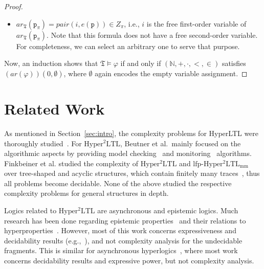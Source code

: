\documentclass[dvipsnames,10pt,a4paper]{amsart}
\theoremstyle{definition}
\theoremstyle{remark}
\newcommand{\nats}{\mathbb{N}}
\renewcommand{\phi}{\varphi}
\newcommand{\sohyltl}{\mathrm{Hyper^2LTL}\xspace}
\newcommand{\lfpsohyltlfp}{\mathrm{lfp\text{-}{Hyper^2LTL_{\mathrm{mm}}}}\xspace}
\newcommand{\tsys}{\mathfrak{T}}
\newcommand{\proposition}{\texttt{p}}
\newcommand{\arithmetize}{{\mathit{ar}}}
\newcommand{\pair}{\mathit{pair}}
\newcommand{\natsstruct}{(\nats, +, \cdot, <, \in)}
\begin{document}
\begin{proof}
\begin{itemize}
    \item $\arithmetize_\tsys(\proposition_\pi) = \pair(i,e(\proposition)) \in Z_\pi$, i.e., $i$ is the free first-order variable of $\arithmetize_\tsys(\proposition_\pi)$. Note that this formula does not have a free second-order variable. For completeness, we can select an arbitrary one to serve that purpose.
    
\end{itemize}
Now, an induction shows that $\tsys\models \phi$ if and only if $\natsstruct$ satisfies $(\arithmetize(\phi))(0,\emptyset)$, where $\emptyset$ again encodes the empty variable assignment.
\end{proof}





\section{Related Work}
\label{sec_relatedwork}
As mentioned in Section~\ref{sec:intro}, the complexity problems for HyperLTL were thoroughly studied~\cite{FinkbeinerH16,hyperltlsatconf,hyperltlsat}. For $\sohyltl$, Beutner et al.\ mainly focused on the algorithmic aspects by providing model checking~\cite{DBLP:conf/cav/BeutnerFFM23} and monitoring~\cite{BeutnerFFM24} algorithms.
Finkbeiner et al. studied the complexity of $\sohyltl$ and $\lfpsohyltlfp$ over tree-shaped and acyclic structures, which contain finitely many traces~\cite{FoSSaCS26}, thus all problems become decidable.
None of the above studied the respective complexity problems for general structures in depth. 

Logics related to $\sohyltl$ are asynchronous and epistemic logics. Much research has been done regarding epistemic properties~\cite{DBLP:conf/clima/Dima08,DBLP:books/mit/FHMV1995,DBLP:conf/atal/LomuscioR06a,DBLP:conf/fsttcs/MeydenS99} and their relations to hyperproperties~\cite{DBLP:conf/fossacs/BozzelliMP15}. However, most of this work concerns expressiveness and decidability results (e.g.,~\cite{DBLP:journals/tocl/BozzelliMM24}), and not complexity analysis for the undecidable fragments. This is similar for asynchronous hyperlogics~\cite{BartocciHNC23,DBLP:conf/cav/BaumeisterCBFS21,BeutnerF23,DBLP:journals/corr/abs-2404-16778,DBLP:conf/lics/BozzelliPS21,DBLP:conf/concur/BozzelliPS22,DBLP:journals/pacmpl/GutsfeldMO21,DBLP:conf/mfcs/KontinenSV23,KontinenSV24,DBLP:conf/mfcs/KrebsMV018}, where most work concerns decidability results and expressive power, but not complexity analysis. 
\end{document}
